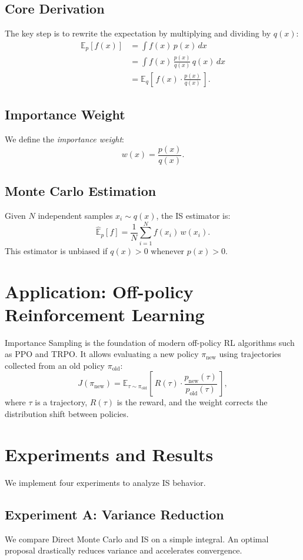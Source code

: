 \documentclass[conference,compsoc]{IEEEtran}
\begin{document}
\subsection{Core Derivation}
The key step is to rewrite the expectation by multiplying and dividing by \(q(x)\):
\begin{align*}
\mathbb{E}_{p}[f(x)] 
&= \int f(x)\,p(x)\,dx \\
&= \int f(x)\,\frac{p(x)}{q(x)}\,q(x)\,dx \\
&= \mathbb{E}_{q}\left[\,f(x)\cdot \frac{p(x)}{q(x)}\,\right].
\end{align*}

\subsection{Importance Weight}
We define the \emph{importance weight}:
\[
w(x) = \frac{p(x)}{q(x)}.
\]

\subsection{Monte Carlo Estimation}
Given \(N\) independent samples \(x_i \sim q(x)\), the IS estimator is:
\[
\hat{\mathbb{E}}_{p}[f] = \frac{1}{N}\sum_{i=1}^N f(x_i)\,w(x_i).
\]
This estimator is unbiased if \(q(x) > 0\) whenever \(p(x) > 0\).

\section{Application: Off-policy Reinforcement Learning}
Importance Sampling is the foundation of modern off-policy RL algorithms such as PPO and TRPO. It allows evaluating a new policy \(\pi_{\text{new}}\) using trajectories collected from an old policy \(\pi_{\text{old}}\):
\[
J(\pi_{\text{new}}) = \mathbb{E}_{\tau\sim\pi_{\text{old}}}\!\left[\,R(\tau)\cdot \frac{p_{\text{new}}(\tau)}{p_{\text{old}}(\tau)}\,\right],
\]
where \(\tau\) is a trajectory, \(R(\tau)\) is the reward, and the weight corrects the distribution shift between policies.

\section{Experiments and Results}
We implement four experiments to analyze IS behavior.

\subsection{Experiment A: Variance Reduction}
We compare Direct Monte Carlo and IS on a simple integral. An optimal proposal drastically reduces variance and accelerates convergence.
\end{document}
